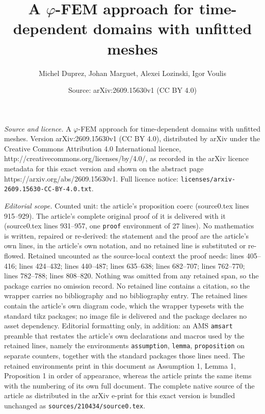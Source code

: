 \documentclass[10pt,a4paper]{amsart}
\title{A \texorpdfstring{$\varphi$}{phi}-FEM approach for time-dependent domains with unfitted meshes}
\author{Michel Duprez, Johan Marguet, Alexei Lozinski, Igor Voulis}
\date{Source: arXiv:2609.15630v1 (CC BY 4.0)}
\begin{document}
\maketitle

\noindent\emph{Source and licence.} A \texorpdfstring{$\varphi$}{phi}-FEM approach for time-dependent domains with unfitted meshes. Version arXiv:2609.15630v1 (CC BY 4.0), distributed by arXiv under the Creative Commons Attribution 4.0 International licence, http://creativecommons.org/licenses/by/4.0/, as recorded in the arXiv licence metadata for this exact version and shown on the abstract page https://arxiv.org/abs/2609.15630v1. Full licence notice: \texttt{licenses/arxiv-2609.15630-CC-BY-4.0.txt}.\par\smallskip

\noindent\textit{Editorial scope.} Counted unit: the article's proposition coerc (source0.tex lines 915--929). The article's complete original proof of it is delivered with it (source0.tex lines 931--957, one \texttt{proof} environment of 27 lines). No mathematics is written, repaired or re-derived: the statement and the proof are the article's own lines, in the article's own notation, and no retained line is substituted or re-flowed.  Retained uncounted as the source-local context the proof needs: lines 405--416; lines 424--432; lines 440--487; lines 635--638; lines 682--707; lines 762--770; lines 782--788; lines 808--820.  Nothing was omitted from any retained span, so the package carries no omission record.  No retained line contains a citation, so the wrapper carries no bibliography and no bibliography entry.  The retained lines contain the article's own diagram code, which the wrapper typesets with the standard tikz packages; no image file is delivered and the package declares no asset dependency.  Editorial formatting only, in addition: an AMS \texttt{amsart} preamble that restates the article's own declarations and macros used by the retained lines, namely the environments \texttt{assumption}, \texttt{lemma}, \texttt{proposition} on separate counters, together with the standard packages those lines need.  The retained environments print in this document as Assumption 1, Lemma 1, Proposition 1 in order of appearance, whereas the article prints the same items with the numbering of its own full document.  The complete native source of the article as distributed in the arXiv e-print for this exact version is bundled unchanged as \texttt{sources/210434/source0.tex}.
\end{document}
